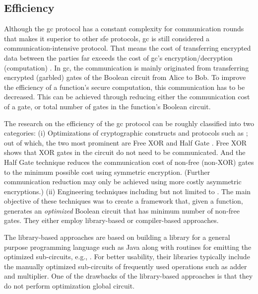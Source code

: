 \subsection{Efficiency}
Although the \acrshort{gc} protocol has a constant complexity for communication rounds that makes it superior to other \acrshort{sfe} protocols, \acrshort{gc} is still considered a communication-intensive protocol.
That means the cost of transferring encrypted data between the parties far exceeds the cost of \acrshort{gc}'s encryption/decryption (computation)  \cite{gueron2015fast}.
In \acrshort{gc}, the communication is mainly originated from transferring encrypted (garbled) gates of the Boolean circuit from Alice to Bob.
To improve the efficiency of a function's secure computation, this communication has to be decreased.
This can be achieved through reducing either the communication cost of a gate, or total number of gates in the function's Boolean circuit.

The research on the efficiency of the \acrshort{gc} protocol can be roughly classified into two categories:
(i) Optimizations of cryptographic constructs and protocols such as \cite{kolesnikov2008improved,pinkas2009secure,bellare2012foundations,bellare2013efficient,kolesnikov2014flexor,zahur2015two}; out of which, the two most prominent are Free XOR \cite{kolesnikov2008improved} and Half Gate \cite{zahur2015two}.
Free XOR shows that XOR gates in the circuit do not need to be communicated.
And the Half Gate technique reduces the communication cost of non-free (non-XOR) gates to the minimum possible cost using symmetric encryption. (Further communication reduction may only be achieved using more costly asymmetric encryptions.)
(ii) Engineering techniques including but not limited to \cite{henecka2010tasty,huang2011faster,henecka2013faster,kreuter2013pcf,franz2014cbmc,mood2016frigate}.
The main objective of these techniques was to create a framework that, given a function, generates an \textit{optimized} Boolean circuit that has minimum number of non-free gates.
They either employ library-based or compiler-based approaches.

The library-based approaches are based on building a library for a general purpose programming language such as Java along with routines for emitting the optimized sub-circuits, e.g., \cite{huang2011faster,malka2011vmcrypt,henecka2013faster}.
For better usability, their libraries typically include the manually optimized sub-circuits of frequently used operations such as adder and multiplier.
One of the drawbacks of the library-based approaches is that they do not perform optimization global circuit.

